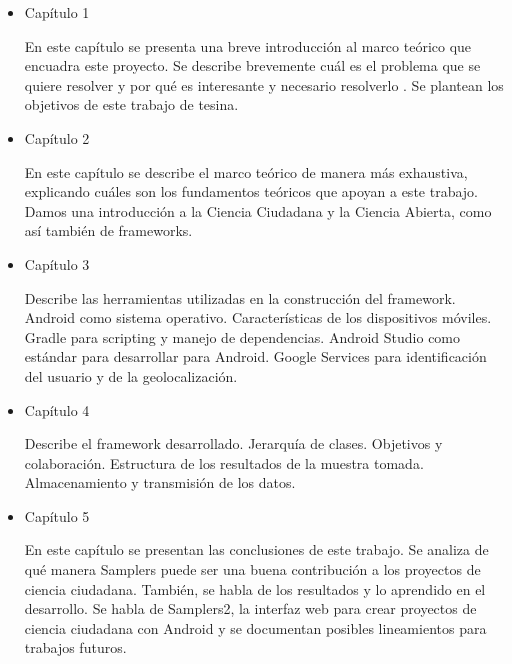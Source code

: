 \begin{itemize} 
	\item{Capítulo 1} 
		\begin{description} En este capítulo se presenta una breve introducción al marco teórico que encuadra este proyecto. Se describe brevemente cuál es el problema que se quiere resolver y por qué es interesante y necesario resolverlo \cite{Zobel04a}. Se plantean los objetivos de este trabajo de tesina.
		\end{description}

	\item{Capítulo 2} 
		\begin{description} En este capítulo se describe el marco teórico de manera más exhaustiva, explicando cuáles son los fundamentos teóricos que apoyan a este trabajo. Damos una introducción a la Ciencia Ciudadana y la Ciencia Abierta, como así también de frameworks.
		\end{description}
	
	\item{Capítulo 3} 
		\begin{description} Describe las herramientas utilizadas en la construcción del framework. Android como sistema operativo. Características de los dispositivos móviles. Gradle para scripting y manejo de dependencias. Android Studio como estándar para desarrollar para Android. Google Services para identificación del usuario y de la geolocalización. 
		\end{description}
	
	\item{Capítulo 4} 
		\begin{description} Describe el framework desarrollado. Jerarquía de clases. Objetivos y colaboración. Estructura de los resultados de la muestra tomada. Almacenamiento y transmisión de los datos.
		\end{description}

	\item{Capítulo 5} 
		\begin{description} En este capítulo se presentan las conclusiones de este trabajo. Se analiza de qué manera Samplers puede ser una buena contribución a los proyectos de ciencia ciudadana. También, se habla de los resultados y lo aprendido en el desarrollo. Se habla de Samplers2, la interfaz web para crear proyectos de ciencia ciudadana con Android y se documentan posibles lineamientos para trabajos futuros.
		\end{description}
\end{itemize}
